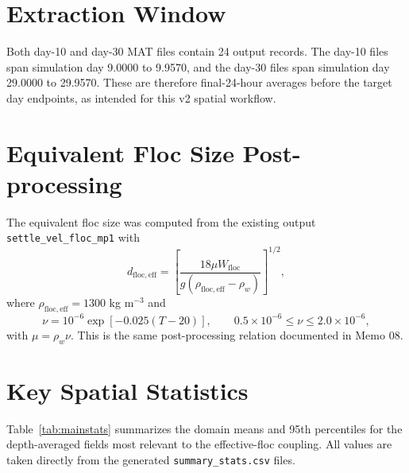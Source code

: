 \documentclass[11pt]{article}
\begin{document}
\section*{Extraction Window}

Both day-10 and day-30 MAT files contain 24 output records.  The day-10 files
span simulation day 9.0000 to 9.9570, and the day-30 files span simulation day
29.0000 to 29.9570.  These are therefore final-24-hour averages before the
target day endpoints, as intended for this v2 spatial workflow.

\section*{Equivalent Floc Size Post-processing}

The equivalent floc size was computed from the existing output
\texttt{settle\_vel\_floc\_mp1} with
\begin{equation}
  d_{\mathrm{floc,eff}} =
  \left[
  \frac{18 \mu W_{\mathrm{floc}}}
       {g(\rho_{\mathrm{floc,eff}}-\rho_w)}
  \right]^{1/2},
\end{equation}
where $\rho_{\mathrm{floc,eff}} = 1300$ kg m$^{-3}$ and
\begin{equation}
  \nu = 10^{-6}\exp[-0.025(T-20)], \qquad
  0.5\times10^{-6} \le \nu \le 2.0\times10^{-6},
\end{equation}
with $\mu=\rho_w\nu$.  This is the same post-processing relation documented in
Memo 08.

\section*{Key Spatial Statistics}

Table~\ref{tab:mainstats} summarizes the domain means and 95th percentiles for
the depth-averaged fields most relevant to the effective-floc coupling.  All
values are taken directly from the generated \texttt{summary\_stats.csv} files.
\end{document}
